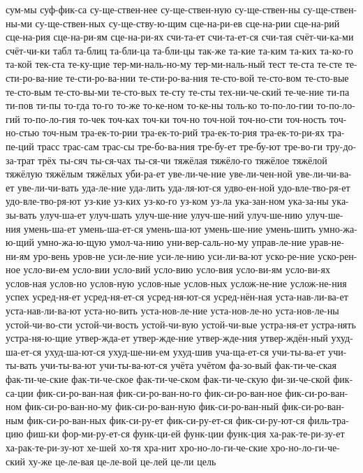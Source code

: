 {сум-мы
суф-фик-са
су-ще-ствен-нее
су-ще-ствен-ную
су-ще-ствен-ны
су-ще-ствен-ны-ми
су-ще-ствен-ных
су-ще-ству-ю-щим
сце-на-ри-ев
сце-на-рии
сце-на-рий
сце-на-рия
сце-на-ри-ям
сце-на-ри-ях
счи-та-ет
счи-та-ет-ся
счи-тая
счёт-чи-ка-ми
счёт-чи-ки
табл
та-блиц
та-бли-ца
та-бли-цы
так-же
та-кие
та-ким
та-ких
та-ко-го
та-кой
тек-ста
те-ку-щие
тер-ми-наль-но-му
тер-ми-наль-ный
тест
те-ста
те-сте
те-сти-ро-ва-ние
те-сти-ро-ва-нии
те-сти-ро-ва-ния
те-сто-вой
те-сто-вом
те-сто-вые
те-сто-вым
те-сто-вы-ми
те-сто-вых
те-сту
те-сты
тех-ни-че-ский
те-че-ние
ти-па
ти-пов
ти-пы
то-гда
то-го
то-же
то-ке-ном
то-ке-ны
толь-ко
то-по-ло-гии
то-по-ло-гий
то-по-ло-гия
то-чек
точ-ках
точ-ки
точ-но
точ-ной
точ-но-сти
точ-ность
точ-но-стью
точ-ным
тра-ек-то-рии
тра-ек-то-рий
тра-ек-то-рия
тра-ек-то-ри-ях
тра-пе-ций
трасс
трас-сам
трас-сы
тре-бо-ва-ния
тре-бу-ет
тре-бу-ют
тре-во-ги
тру-до-за-трат
трёх
ты-сяч
ты-ся-чах
ты-ся-чи
тяжёлая
тяжёло-го
тяжёлое
тяжёлой
тяжёлую
тяжёлым
тяжёлых
уби-ра-ет
уве-ли-че-ние
уве-ли-чен-ной
уве-ли-чи-ва-ет
уве-ли-чи-вать
уда-ле-ние
уда-лить
уда-ля-ют-ся
удво-ен-ной
удо-вле-тво-ря-ет
удо-вле-тво-ря-ют
уз-кие
уз-ких
уз-ко-го
уз-ком
уз-ла
ука-зан-ном
ука-за-ны
ука-зы-вать
улуч-ша-ет
улуч-шать
улуч-ше-ние
улуч-ше-ний
улуч-ше-нию
улуч-ше-ния
умень-ша-ет
умень-ша-ет-ся
умень-ша-ют
умень-ше-ние
умень-шить
умно-жа-ю-щий
умно-жа-ю-щую
умол-ча-нию
уни-вер-саль-но-му
управ-ле-ние
урав-не-ни-ям
уро-вень
уров-не
уси-ле-ние
уси-ле-нию
уси-ли-ва-ют
уско-ре-ние
уско-рен-ное
усло-ви-ем
усло-вии
усло-вий
усло-вию
усло-вия
усло-ви-ям
усло-ви-ях
услов-ная
услов-но
услов-ную
услов-ные
услов-ных
услож-не-ние
услож-не-ния
успех
усред-ня-ет
усред-ня-ет-ся
усред-ня-ют-ся
усред-нён-ная
уста-нав-ли-ва-ет
уста-нав-ли-ва-ют
уста-но-вить
уста-нов-ле-ние
уста-нов-ле-но
уста-нов-ле-ны
устой-чи-во-сти
устой-чи-вость
устой-чи-вую
устой-чи-вые
устра-ня-ет
устра-нять
устра-ня-ю-щие
утвер-жда-ет
утвер-жде-ние
утвер-жде-ния
утвер-ждён-ный
ухуд-ша-ет-ся
ухуд-ша-ют-ся
ухуд-ше-ни-ем
ухуд-шив
уча-ща-ет-ся
учи-ты-ва-ет
учи-ты-вать
учи-ты-ва-ют
учи-ты-ва-ют-ся
учёта
учётом
фа-зо-вый
фак-ти-че-ская
фак-ти-че-ские
фак-ти-че-ское
фак-ти-че-ском
фак-ти-че-скую
фи-зи-че-ской
фик-са-ции
фик-си-ро-ван-ная
фик-си-ро-ван-но-го
фик-си-ро-ван-ное
фик-си-ро-ван-ном
фик-си-ро-ван-но-му
фик-си-ро-ван-ную
фик-си-ро-ван-ный
фик-си-ро-ван-ным
фик-си-ро-ван-ных
фик-си-ру-ет
фик-си-ру-ет-ся
фик-си-ру-ют-ся
филь-тра-цию
фиш-ки
фор-ми-ру-ет-ся
функ-ци-ей
функ-ции
функ-ция
ха-рак-те-ри-зу-ет
ха-рак-те-ри-зу-ют
хе-шей
хо-тя
хра-нит
хро-но-ло-ги-че-ские
хро-но-ло-ги-че-ский
ху-же
це-ле-вая
це-ле-вой
це-лей
це-ли
цель
}
